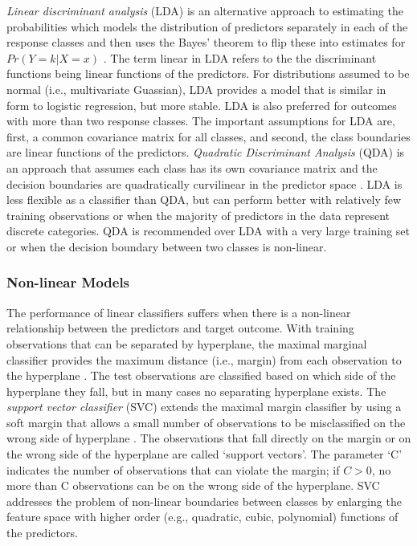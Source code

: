 \documentclass[sigconf]{acmart}
\begin{document}
\emph{Linear discriminant analysis} (LDA) is an alternative approach to 
estimating the probabilities which models the distribution of predictors 
separately in each of the response classes and then uses the Bayes' theorem 
to flip these into estimates for $Pr(Y=k | X=x)$ \cite{james13}. The term 
linear in LDA refers to the the discriminant functions being linear functions 
of the predictors. For distributions assumed to be normal (i.e., multivariate 
Guassian), LDA provides a model that is similar in form to logistic regression, 
but more stable. LDA is also preferred for outcomes with more than two response 
classes. The important assumptions for LDA are, first, a common covariance 
matrix for all classes, and second, the class boundaries are linear functions 
of the predictors. \emph{Quadratic Discriminant Analysis} (QDA) is an approach 
that assumes each class has its own covariance matrix and the decision 
boundaries are quadratically curvilinear in the predictor space \cite{kuhn13}. 
LDA is less flexible as a classifier than QDA, but can perform better with 
relatively few training observations or when the majority of predictors in the 
data represent discrete categories. QDA is recommended over LDA with a very 
large training set or when the decision boundary between two classes is 
non-linear. 


\subsubsection{Non-linear Models}

The performance of linear classifiers suffers when there is a non-linear 
relationship between the predictors and target outcome. With training
observations that can be separated by hyperplane, the maximal marginal 
classifier provides the maximum distance (i.e., margin) from each observation
to the hyperplane \cite{james13}. The test observations are classified based 
on which side of the hyperplane they fall, but in many cases no separating 
hyperplane exists. The \emph{support vector classifier} (SVC) extends the 
maximal margin classifier by using a soft margin that allows a small number 
of observations to be misclassified on the wrong side of hyperplane 
\cite{kuhn13, cortes95}. The observations that fall directly on the margin or 
on the wrong side of the hyperplane are called `support vectors'. The parameter 
`C' indicates the number of observations that can violate the margin; if $C>0$, 
no more than C observations can be on the wrong side of the hyperplane. 
SVC addresses the problem of non-linear boundaries between classes by 
enlarging the feature space with higher order (e.g., quadratic, cubic, 
polynomial) functions of the predictors. 
\end{document}
